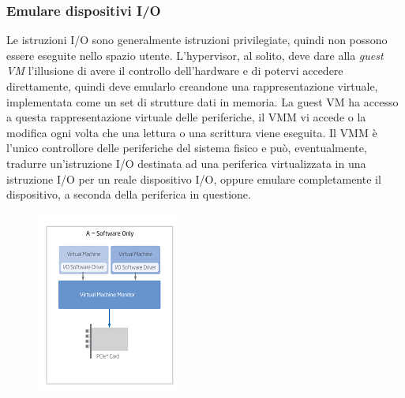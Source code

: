 \documentclass{article}
\begin{document}
\subsubsection{Emulare dispositivi I/O}
Le istruzioni I/O sono generalmente istruzioni privilegiate, quindi non possono essere eseguite nello spazio utente.
L’hypervisor, al solito, deve dare alla \textit{guest VM} l’illusione di avere il controllo dell’hardware e di potervi accedere direttamente, quindi deve emularlo creandone una rappresentazione virtuale, implementata come un set di strutture dati in memoria.
La guest VM ha accesso a questa rappresentazione virtuale delle periferiche, il VMM vi accede o la modifica ogni volta che una lettura o una scrittura viene eseguita.
Il VMM è l’unico controllore delle periferiche del sistema fisico e può, eventualmente, tradurre un’istruzione I/O destinata ad una periferica virtualizzata in una istruzione I/O per un reale dispositivo I/O, oppure emulare completamente il dispositivo, a seconda della periferica in questione.
\begin{figure}[H]
    \centering
    \includegraphics[scale=0.8]{img/Virt_tech/14.png}   
    \caption{}
\end{figure}\noindent
\end{document}
